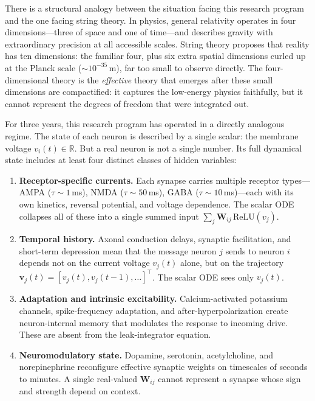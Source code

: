 \documentclass[11pt,twocolumn]{article}
\begin{document}
\vspace{0.2cm}

\noindent There is a structural analogy between the situation facing this research program and the one facing string theory. In physics, general relativity operates in four dimensions---three of space and one of time---and describes gravity with extraordinary precision at all accessible scales. String theory proposes that reality has ten dimensions: the familiar four, plus six extra spatial dimensions curled up at the Planck scale ($\sim\!10^{-35}$\,m), far too small to observe directly. The four-dimensional theory is the \emph{effective} theory that emerges after these small dimensions are compactified: it captures the low-energy physics faithfully, but it cannot represent the degrees of freedom that were integrated out.

For three years, this research program has operated in a directly analogous regime. The state of each neuron is described by a single scalar: the membrane voltage $v_i(t) \in \mathbb{R}$. But a real neuron is not a single number. Its full dynamical state includes at least four distinct classes of hidden variables:
\begin{enumerate}[leftmargin=*,itemsep=1pt]
\item \textbf{Receptor-specific currents.} Each synapse carries multiple receptor types---AMPA ($\tau \sim 1$\,ms), NMDA ($\tau \sim 50$\,ms), GABA ($\tau \sim 10$\,ms)---each with its own kinetics, reversal potential, and voltage dependence. The scalar ODE collapses all of these into a single summed input $\sum_j \mathbf{W}_{ij}\,\text{ReLU}(v_j)$.
\item \textbf{Temporal history.} Axonal conduction delays, synaptic facilitation, and short-term depression mean that the message neuron $j$ sends to neuron $i$ depends not on the current voltage $v_j(t)$ alone, but on the trajectory $\mathbf{v}_j(t) = [v_j(t), v_j(t{-}1), \ldots]^\top$. The scalar ODE sees only $v_j(t)$.
\item \textbf{Adaptation and intrinsic excitability.} Calcium-activated potassium channels, spike-frequency adaptation, and after-hyperpolarization create neuron-internal memory that modulates the response to incoming drive. These are absent from the leak-integrator equation.
\item \textbf{Neuromodulatory state.} Dopamine, serotonin, acetylcholine, and norepinephrine reconfigure effective synaptic weights on timescales of seconds to minutes. A single real-valued $\mathbf{W}_{ij}$ cannot represent a synapse whose sign and strength depend on context.
\end{enumerate}
\end{document}
